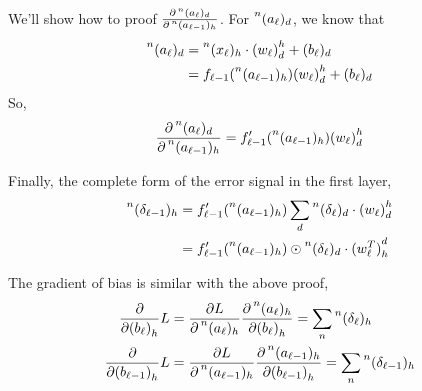 \documentclass[12pt,a4paper]{article}%
\theoremstyle{definition}
\theoremstyle{plain}
\numberwithin{equation}{section}
\begin{document}
We'll show how to proof $\frac{\partial \prescript{n}{}{(a_{\ell})}_{d}}{\partial \prescript{n}{}{(a_{\ell-1})}_{h}}$. For $ \prescript{n}{}{(a_{\ell})}_{d}   $, we know that 
\begin{align*}
\prescript{n}{}{(a_{\ell})}_{d} &= \prescript{n}{}{(x_{\ell})}_{h} \cdot {(w_{\ell})}^{h}_{d}  + (b_{\ell})_{d} \\
													  &= f_{\ell-1}(\prescript{n}{}{(a_{\ell-1})}_{h}) {(w_{\ell})}^{h}_{d} + (b_{\ell})_{d}
\end{align*}
So,
\begin{equation}
\frac{\partial \prescript{n}{}{(a_{\ell})}_{d}}{\partial \prescript{n}{}{(a_{\ell-1})}_{h}} = f'_{\ell-1}(\prescript{n}{}{(a_{\ell-1})}_{h}) {(w_{\ell})}^{h}_{d} 
\end{equation}

Finally, the complete form of the error signal in the first layer,
\begin{align*}
\prescript{n}{}{(\delta_{\ell-1})}_{h} &= f'_{\ell-1}(\prescript{n}{}{(a_{\ell-1})}_{h}) \sum\limits_{d} 	\prescript{n}{}{(\delta_{\ell})}_{d} \cdot  {(w_{\ell})}^{h}_{d} \\
																  &= f'_{\ell-1}(\prescript{n}{}{(a_{\ell-1})}_{h}) \odot \prescript{n}{}{(\delta_{\ell})}_{d} \cdot {(w_{\ell}^{T})}^{d}_{h}
\end{align*}

The gradient of bias is similar with the above proof,
\begin{align*}
\frac{\partial}{\partial {(b_{\ell})}_{h}} L  &= \frac{\partial L}{\partial \prescript{n}{}{(a_{\ell})}_{h}} \frac{\partial \prescript{n}{}{(a_{\ell})}_{h}}{\partial {(b_{\ell})}_{h}} = \sum\limits_{n} \prescript{n}{}{(\delta_{\ell})}_{h} \\
\frac{\partial}{\partial {(b_{\ell-1})}_{h}} L  &= \frac{\partial L}{\partial \prescript{n}{}{(a_{\ell-1})}_{h}} \frac{\partial \prescript{n}{}{(a_{\ell-1})}_{h}}{\partial {(b_{\ell-1})}_{h}} = \sum\limits_{n} \prescript{n}{}{(\delta_{\ell-1})}_{h}
\end{align*}
\end{document}
